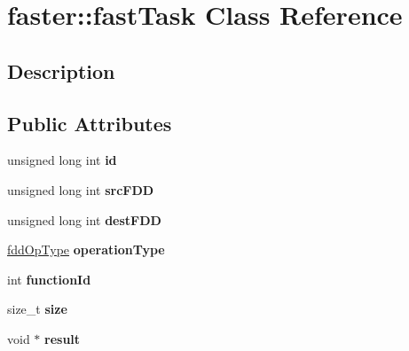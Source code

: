 \hypertarget{classfaster_1_1fastTask}{}\section{faster\+:\+:fast\+Task Class Reference}
\label{classfaster_1_1fastTask}


\subsection{Description}
\subsection*{Public Attributes}
\begin{DoxyCompactItemize}
\item 
\hypertarget{classfaster_1_1fastTask_a0893bafe3573403565cd646887a75f0c}{}\label{classfaster_1_1fastTask_a0893bafe3573403565cd646887a75f0c} 
unsigned long int {\bfseries id}
\item 
\hypertarget{classfaster_1_1fastTask_a667e6dcb5f2088feaaec6be6c1dd7c64}{}\label{classfaster_1_1fastTask_a667e6dcb5f2088feaaec6be6c1dd7c64} 
unsigned long int {\bfseries src\+F\+DD}
\item 
\hypertarget{classfaster_1_1fastTask_ac4f233cc30ee2cc62cdffd6cb07fdb62}{}\label{classfaster_1_1fastTask_ac4f233cc30ee2cc62cdffd6cb07fdb62} 
unsigned long int {\bfseries dest\+F\+DD}
\item 
\hypertarget{classfaster_1_1fastTask_a8a1ca149031975f2200067efdf13c18f}{}\label{classfaster_1_1fastTask_a8a1ca149031975f2200067efdf13c18f} 
\hyperlink{namespacefaster_a64379512d12d41c6e58f176939abfd80}{fdd\+Op\+Type} {\bfseries operation\+Type}
\item 
\hypertarget{classfaster_1_1fastTask_a2803df27d5825ff2420ff53f833f0e0d}{}\label{classfaster_1_1fastTask_a2803df27d5825ff2420ff53f833f0e0d} 
int {\bfseries function\+Id}
\item 
\hypertarget{classfaster_1_1fastTask_abb6680128fc1658c092d3ca57cf1fedc}{}\label{classfaster_1_1fastTask_abb6680128fc1658c092d3ca57cf1fedc} 
size\+\_\+t {\bfseries size}
\item 
\hypertarget{classfaster_1_1fastTask_a4bfc59e6752f4a26c990a701c36bae5d}{}\label{classfaster_1_1fastTask_a4bfc59e6752f4a26c990a701c36bae5d} 
void $\ast$ {\bfseries result}
\item 
\hypertarget{classfaster_1_1fastTask_a01e745141b563ad20722a431390b5df6}{}\label{classfaster_1_1fastTask_a01e745141b563ad20722a431390b5df6} 

\end{DoxyCompactItemize}
